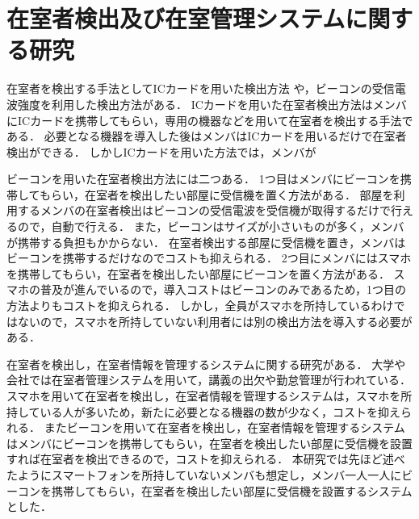 \section{在室者検出及び在室管理システムに関する研究}\label{2.2}
在室者を検出する手法としてICカードを用いた検出方法
\cite{zyugyou}
\cite{felica}
\cite{densi}
\cite{notouchic}
\cite{felicaweb}
\cite{suica}
や，ビーコンの受信電波強度を利用した検出方法\cite{bledakoku}\cite{blesuitei}がある．
ICカードを用いた在室者検出方法はメンバにICカードを携帯してもらい，専用の機器などを用いて在室者を検出する手法である．
必要となる機器を導入した後はメンバはICカードを用いるだけで在室者検出ができる．
しかしICカードを用いた方法では，メンバが

ビーコンを用いた在室者検出方法には二つある．
1つ目はメンバにビーコンを携帯してもらい，在室者を検出したい部屋に受信機を置く方法がある．
部屋を利用するメンバの在室者検出はビーコンの受信電波を受信機が取得するだけで行えるので，自動で行える．
また，ビーコンはサイズが小さいものが多く，メンバが携帯する負担もかからない．
在室者検出する部屋に受信機を置き，メンバはビーコンを携帯するだけなのでコストも抑えられる．
2つ目にメンバにはスマホを携帯してもらい，在室者を検出したい部屋にビーコンを置く方法がある．
スマホの普及が進んでいる\cite{hukyu}ので，導入コストはビーコンのみであるため，1つ目の方法よりもコストを抑えられる．
しかし，全員がスマホを所持しているわけではないので，スマホを所持していない利用者には別の検出方法を導入する必要がある．

在室者を検出し，在室者情報を管理するシステムに関する研究がある\cite{smartphoneAndRoom}\cite{laboratory}\cite{prep}．
大学や会社では在室者管理システムを用いて，講義の出欠\cite{smartphone}\cite{nfcandroid}\cite{android}\cite{smartbase}\cite{garake}や勤怠管理\cite{amano}が行われている．
スマホを用いて在室者を検出し，在室者情報を管理するシステムは，スマホを所持している人が多いため，新たに必要となる機器の数が少なく，コストを抑えられる\cite{smartphoneAndRoom}．
またビーコンを用いて在室者を検出し，在室者情報を管理するシステムはメンバにビーコンを携帯してもらい，在室者を検出したい部屋に受信機を設置すれば在室者を検出できるので，コストを抑えられる\cite{laboratory}\cite{prep}．
本研究では先ほど述べたようにスマートフォンを所持していないメンバも想定し，メンバ一人一人にビーコンを携帯してもらい，在室者を検出したい部屋に受信機を設置するシステムとした．


